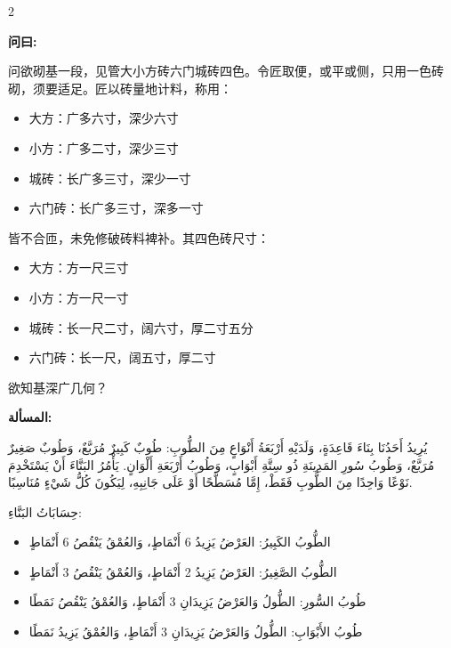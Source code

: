 \documentclass[11pt,a4paper]{article}
\newcommand{\ar}[1]{\arabicfont\beginR #1\endR}
\newenvironment{bilingual}{%
  \begin{paracol}{2}
}{%
  \end{paracol}
}
\newcommand{\cnlabel}[1]{\textcolor{algocolor}{\textbf{#1}}}
\newcommand{\arlabel}[1]{\ar{\textcolor{algocolor}{\textbf{#1}}}}
\begin{document}
\begin{bilingual}

\begin{leftcolumn*}
\cnlabel{问曰:}

问欲砌基一段，见管大小方砖六门城砖四色。令匠取便，或平或侧，只用一色砖砌，须要适足。匠以砖量地计料，称用：
\begin{itemize}
  \item 大方：广多六寸，深少六寸
  \item 小方：广多二寸，深少三寸
  \item 城砖：长广多三寸，深少一寸
  \item 六门砖：长广多三寸，深多一寸
\end{itemize}

皆不合匝，未免修破砖料裨补。其四色砖尺寸：
\begin{itemize}
  \item 大方：方一尺三寸
  \item 小方：方一尺一寸
  \item 城砖：长一尺二寸，阔六寸，厚二寸五分
  \item 六门砖：长一尺，阔五寸，厚二寸
\end{itemize}

欲知基深广几何？
\end{leftcolumn*}

\begin{rightcolumn*}
\arlabel{المسألة:}

\ar{يُرِيدُ أَحَدُنَا بِنَاءَ قَاعِدَةٍ، وَلَدَيْهِ أَرْبَعَةُ أَنْوَاعٍ مِنَ الطُّوبِ: طُوبٌ كَبِيرٌ مُرَبَّعٌ، وَطُوبٌ صَغِيرٌ مُرَبَّعٌ، وَطُوبُ سُورِ المَدِينَةِ ذُو سِتَّةِ أَبْوَابٍ، وَطُوبُ أَرْبَعَةِ أَلْوَانٍ. يَأْمُرُ البَنَّاءَ أَنْ يَسْتَخْدِمَ نَوْعًا وَاحِدًا مِنَ الطُّوبِ فَقَطْ، إِمَّا مُسَطَّحًا أَوْ عَلَى جَانِبِهِ، لِيَكُونَ كُلُّ شَيْءٍ مُنَاسِبًا.}

\ar{حِسَابَاتُ البَنَّاءِ:}
\begin{itemize}
  \item \ar{الطُّوبُ الكَبِيرُ: العَرْضُ يَزِيدُ 6 أَنْمَاطٍ، وَالعُمْقُ يَنْقُصُ 6 أَنْمَاطٍ}
  \item \ar{الطُّوبُ الصَّغِيرُ: العَرْضُ يَزِيدُ 2 أَنْمَاطٍ، وَالعُمْقُ يَنْقُصُ 3 أَنْمَاطٍ}
  \item \ar{طُوبُ السُّورِ: الطُّولُ وَالعَرْضُ يَزِيدَانِ 3 أَنْمَاطٍ، وَالعُمْقُ يَنْقُصُ نَمَطًا}
  \item \ar{طُوبُ الأَبْوَابِ: الطُّولُ وَالعَرْضُ يَزِيدَانِ 3 أَنْمَاطٍ، وَالعُمْقُ يَزِيدُ نَمَطًا}
\end{itemize}


\end{rightcolumn*}
\end{bilingual}
\end{document}
